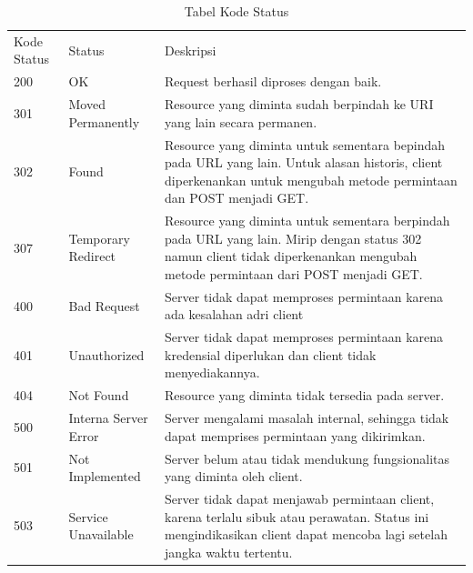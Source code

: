 \begin{table}[H]
\centering
\begin{tabular}{|p{3cm}|p{5cm}|p{5cm}|}
Kode Status & Status               & Deskripsi                                                                                                                                                                      \\
200         & OK                   & Request berhasil diproses dengan baik.                                                                                                                                         \\
301         & Moved Permanently    & Resource yang diminta sudah berpindah ke URI yang lain secara permanen.                                                                                                        \\
302         & Found                & Resource yang diminta untuk sementara bepindah pada URL yang lain. Untuk alasan historis, client diperkenankan untuk mengubah metode permintaan dan POST menjadi GET.          \\
307         & Temporary Redirect   & Resource yang diminta untuk sementara berpindah pada URL yang lain. Mirip dengan status 302 namun client tidak diperkenankan mengubah metode permintaan dari POST menjadi GET. \\
400         & Bad Request          & Server tidak dapat memproses permintaan karena ada kesalahan adri client                                                                                                       \\
401         & Unauthorized         & Server tidak dapat memproses permintaan karena kredensial diperlukan dan client tidak menyediakannya.                                                                          \\
404         & Not Found            & Resource yang diminta tidak tersedia pada server.                                                                                                                              \\
500         & Interna Server Error & Server mengalami masalah internal, sehingga tidak dapat memprises permintaan yang dikirimkan.                                                                                  \\
501         & Not Implemented      & Server belum atau tidak mendukung fungsionalitas yang diminta oleh client.                                                                                                     \\
503         & Service Unavailable  & Server tidak dapat menjawab permintaan client, karena terlalu sibuk atau perawatan. Status ini mengindikasikan client dapat mencoba lagi setelah jangka waktu tertentu.       
\caption[Tabel Kode Status]{Tabel Kode Status}
\label{table:kodestatus}

\end{tabular}
\end{table}

